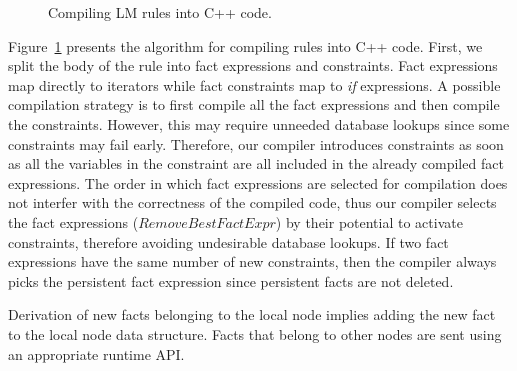 \begin{figure}
 \caption{Compiling LM rules into C++ code.}
 \label{alg:compile_rule}
\end{figure}

Figure~\ref{alg:compile_rule} presents the algorithm for compiling rules into
C++ code. First, we split the body of the rule into fact expressions and
constraints. Fact expressions map directly to iterators while fact constraints
map to \emph{if} expressions. A possible compilation strategy is to first
compile all the fact expressions and then compile the constraints. However, this
may require unneeded database lookups since some constraints may fail early.
Therefore, our compiler introduces constraints as soon as all the variables in
the constraint are all included in the already compiled fact expressions. The
order in which fact expressions are selected for compilation does not interfer
with the correctness of the compiled code, thus our compiler selects the fact
expressions ($RemoveBestFactExpr$) by their potential to activate constraints,
therefore avoiding undesirable database lookups. If two fact expressions have
the same number of new constraints, then the compiler always picks the
persistent fact expression since persistent facts are not deleted.

Derivation of new facts belonging to the local node implies adding the new fact
to the local node data structure. Facts that belong to other nodes are sent
using an appropriate runtime API.

